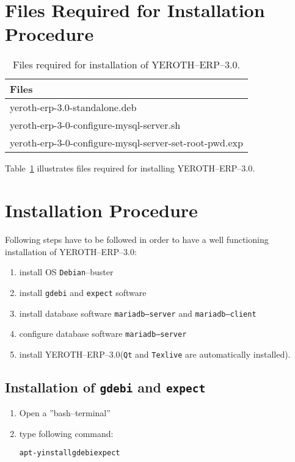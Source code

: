 \documentclass[a4paper, 10pt]{article}
\newcommand{\texlive}{\texttt{Texlive}\xspace}
\newcommand{\gdebi}{\texttt{gdebi}\xspace}
\newcommand{\expect}{\texttt{expect}\xspace}
\newcommand{\debian}{\texttt{Debian}\xspace}
\newcommand{\qt}{\texttt{Qt}\xspace}
\newcommand{\mariadbserver}{\texttt{mariadb--server}\xspace}
\newcommand{\mariadbclient}{\texttt{mariadb--client}\xspace}
\newcommand{\yerotherptroiszero}{\textcolor{yerothColorBlue}{\sc YEROTH--ERP--$3.0$}\xspace}
\newcommand{\yerotherp}{\textcolor{yerothColorBlue}{\sc YEROTH--ERP--$3.0$}\xspace}
\newcommand{\rootcommand}[1]{
\begin{center}
\textcolor{purplish}{#1\xspace}
\end{center}}
\begin{document}
\section{Files Required for Installation Procedure}

\begin{table}[!htbp]
\centering
\begin{tabular}{|l|} \hline
\textbf{Files}		\\ \hline
yeroth-erp-3.0-standalone.deb							\\ \hline
yeroth-erp-3-0-configure-mysql-server.sh				\\ \hline	
yeroth-erp-3-0-configure-mysql-server-set-root-pwd.exp	\\ \hline	
\end{tabular}
\caption{Files required for installation of \yerotherptroiszero.}
\label{tab:prerequisite-files}
\end{table}

Table~\ref{tab:prerequisite-files} illustrates files required
for installing \yerotherp.

\section{Installation Procedure}

Following steps have to be followed in order to have
a well functioning installation of \yerotherptroiszero:

\begin{enumerate} [1)]
	\item install OS \debian--buster
	\item install \gdebi and \expect software
	\item install database software \mariadbserver and \mariadbclient
	\item configure database software \mariadbserver
	\item install \yerotherptroiszero (\qt and \texlive are automatically installed).
\end{enumerate}

\subsection{Installation of \gdebi and \expect}

\begin{enumerate}[1)]
	\item Open a ''bash--terminal''
	\item type following command:
		\begin{alltt}
			\rootcommand{apt -y install gdebi expect}
		\end{alltt}
\end{enumerate} 
\end{document}

